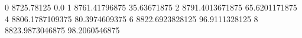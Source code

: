 0 8725.78125 0.0
1 8761.41796875 35.63671875
2 8791.4013671875 65.6201171875
4 8806.1787109375 80.3974609375
6 8822.6923828125 96.9111328125
8 8823.9873046875 98.2060546875
